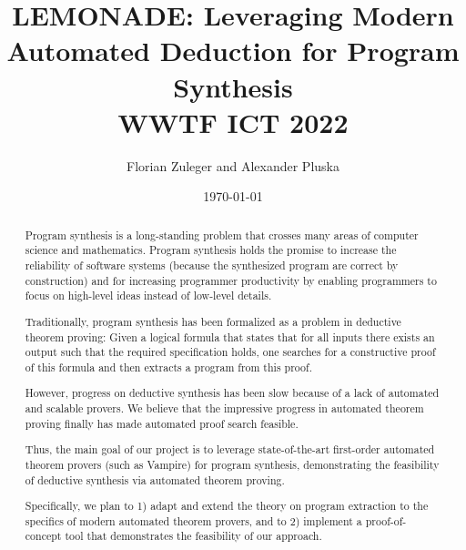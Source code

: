 \documentclass[a4paper,12pt]{article}
\begin{document}
\title{LEMONADE: Leveraging Modern Automated Deduction for Program Synthesis\\
\vspace{0.5cm}
\large{WWTF ICT 2022}}
\author{Florian Zuleger and Alexander Pluska}
\date{\today}
\maketitle


\begin{abstract}

  Program synthesis is a long-standing problem that crosses many areas of computer science and mathematics.
  Program synthesis holds the promise to  increase the reliability of software systems (because the synthesized program are correct by construction) and for increasing programmer productivity by enabling programmers to focus on high-level ideas instead of low-level details.

  Traditionally, program synthesis has been formalized as a problem in deductive theorem proving:
  Given a logical formula that states that for all inputs there exists an output such that the required specification holds, one searches for a constructive proof of this formula and then extracts a program from this proof.

  However, progress on deductive synthesis has been slow because of a lack of automated and scalable provers.
  We believe that the impressive progress in automated theorem proving finally has made automated proof search feasible.

  Thus, the main goal of our project is to leverage state-of-the-art first-order automated theorem provers (such as Vampire) for program synthesis, demonstrating the feasibility of deductive synthesis via automated theorem proving.

  Specifically, we plan to 1) adapt and extend the theory on program extraction to the specifics of modern automated theorem provers, and to 2) implement a proof-of-concept tool that demonstrates the feasibility of our approach.
\end{abstract}
\end{document}
